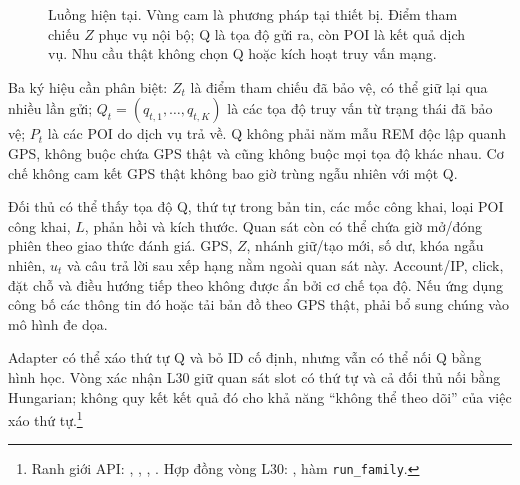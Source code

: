 \begin{figure}[htbp]
{}
\caption{Luồng hiện tại. Vùng cam là phương pháp tại thiết bị. Điểm tham chiếu $Z$ phục vụ nội bộ; Q là tọa độ gửi ra, còn POI là kết quả dịch vụ. Nhu cầu thật không chọn Q hoặc kích hoạt truy vấn mạng.}
\label{fig:current-method-flow}
\end{figure}

Ba ký hiệu cần phân biệt: \textbf{$Z_t$} là điểm tham chiếu đã bảo vệ, có thể giữ lại qua nhiều lần gửi; \textbf{$Q_t=(q_{t,1},\ldots,q_{t,K})$} là các tọa độ truy vấn từ trạng thái đã bảo vệ; \textbf{$P_t$} là các POI do dịch vụ trả về. Q không phải năm mẫu REM độc lập quanh GPS, không buộc chứa GPS thật và cũng không buộc mọi tọa độ khác nhau. Cơ chế không cam kết GPS thật không bao giờ trùng ngẫu nhiên với một Q.

Đối thủ có thể thấy tọa độ Q, thứ tự trong bản tin, các mốc công khai, loại POI công khai, $L$, phản hồi và kích thước. Quan sát còn có thể chứa giờ mở/đóng phiên theo giao thức đánh giá. GPS, $Z$, nhánh giữ/tạo mới, số dư, khóa ngẫu nhiên, $u_t$ và câu trả lời sau xếp hạng nằm ngoài quan sát này. Account/IP, click, đặt chỗ và điều hướng tiếp theo không được ẩn bởi cơ chế tọa độ. Nếu ứng dụng công bố các thông tin đó hoặc tải bản đồ theo GPS thật, phải bổ sung chúng vào mô hình đe dọa.

Adapter có thể xáo thứ tự Q và bỏ ID cố định, nhưng vẫn có thể nối Q bằng hình học. Vòng xác nhận L30 giữ quan sát slot có thứ tự và cả đối thủ nối bằng Hungarian; không quy kết kết quả đó cho khả năng ``không thể theo dõi'' của việc xáo thứ tự.\footnote{Ranh giới API: , , , . Hợp đồng vòng L30: , hàm \texttt{run\_family}.}

